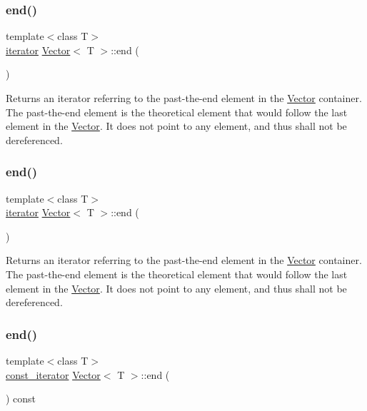 \subsubsection{\texorpdfstring{end()}{end()}\hspace{0.1cm}{\footnotesize\ttfamily [1/4]}}
{\footnotesize\ttfamily template$<$class T$>$ \\
\hyperlink{classVector_a45531016f99e90887e0f890f2da943e4}{iterator} \hyperlink{classVector}{Vector}$<$ T $>$\+::end (\begin{DoxyParamCaption}{ }\end{DoxyParamCaption})\hspace{0.3cm}{\ttfamily [inline]}}

Returns an iterator referring to the {\ttfamily past-\/the-\/end} element in the \hyperlink{classVector}{Vector} container. The past-\/the-\/end element is the theoretical element that would follow the last element in the \hyperlink{classVector}{Vector}. It does not point to any element, and thus shall not be dereferenced. \mbox{\label{classVector_ae288fa619188bff101d5300b8aaf9a90}} 
\subsubsection{\texorpdfstring{end()}{end()}\hspace{0.1cm}{\footnotesize\ttfamily [2/4]}}
{\footnotesize\ttfamily template$<$class T$>$ \\
\hyperlink{classVector_a45531016f99e90887e0f890f2da943e4}{iterator} \hyperlink{classVector}{Vector}$<$ T $>$\+::end (\begin{DoxyParamCaption}{ }\end{DoxyParamCaption})\hspace{0.3cm}{\ttfamily [inline]}}

Returns an iterator referring to the {\ttfamily past-\/the-\/end} element in the \hyperlink{classVector}{Vector} container. The past-\/the-\/end element is the theoretical element that would follow the last element in the \hyperlink{classVector}{Vector}. It does not point to any element, and thus shall not be dereferenced. \mbox{\label{classVector_a3f5f39e8ec9f506664b259299e79c485}} 
\subsubsection{\texorpdfstring{end()}{end()}\hspace{0.1cm}{\footnotesize\ttfamily [3/4]}}
{\footnotesize\ttfamily template$<$class T$>$ \\
\hyperlink{classVector_a484e934cc06bb84c7d70042e792b6e55}{const\+\_\+iterator} \hyperlink{classVector}{Vector}$<$ T $>$\+::end (\begin{DoxyParamCaption}{ }\end{DoxyParamCaption}) const\hspace{0.3cm}{\ttfamily [inline]}}

